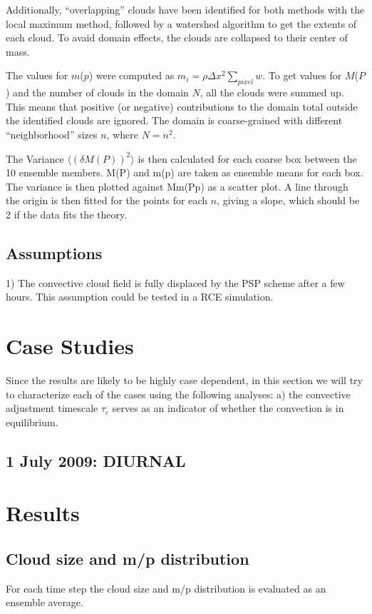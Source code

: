 \documentclass[a4paper, 12pt]{article}
\begin{document}
Additionally, ``overlapping'' clouds have been identified for both methods with the local maximum method, followed by a watershed algorithm to get the extents of each cloud. To avaid domain effects, the clouds are collapsed to their center of mass. 

The values for $m$($p$) were computed as  $m_i = \rho \Delta x^2 \sum_{pixel} w$. To get values for $M$($P$) and the number of clouds in the domain $N$, all the clouds were summed up. This means that positive (or negative) contributions to the domain total outside the identified clouds are ignored. The domain is coarse-grained with different ``neighborhood'' sizes $n$, where $N = n^2$. 

The Variance $\langle (\delta M(P))^2 \rangle$ is then calculated for each coarse box between the 10 ensemble members. M(P) and m(p) are taken as ensemble means for each box. The variance is then plotted against Mm(Pp) as a scatter plot. A line through the origin is then fitted for the points for each $n$, giving a slope, which should be 2 if the data fits the theory. 

\subsection{Assumptions}
1) The convective cloud field is fully displaced by the PSP scheme after a few hours. This assumption could be tested in a RCE simulation. 

\section{Case Studies}
Since the results are likely to be highly case dependent, in this section we will try to characterize each of the cases using the following analyses: a) the convective adjustment timescale $\tau_c$ serves as an indicator of whether the convection is in equilibrium. 
\subsection{1 July 2009: DIURNAL}

\section{Results}
\subsection{Cloud size and m/p distribution}
For each time step the cloud size and m/p distribution is evaluated as an ensemble average.
\end{document}
